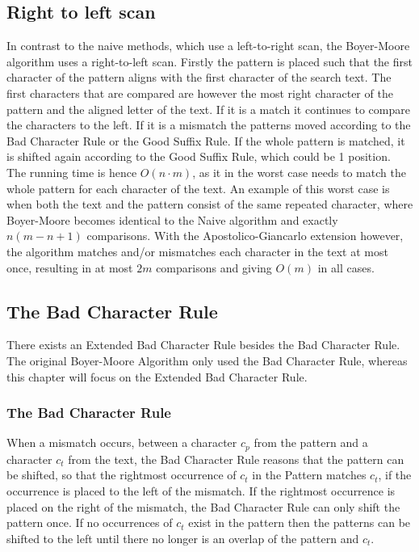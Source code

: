 \subsection{Right to left scan}
In contrast to the naive methods, which use a left-to-right scan, the Boyer-Moore algorithm uses a right-to-left scan. Firstly the pattern is placed such that the first character of the pattern aligns with the first character of the search text. The first characters that are compared are however the most right character of the pattern and the aligned letter of the text. If it is a match it continues to compare the characters to the left. If it is a mismatch the patterns moved according to the Bad Character Rule or the Good Suffix Rule. If the whole pattern is matched, it is shifted again according to the Good Suffix Rule, which could be 1 position. The running time is hence $O(n\cdot m)$, as it in the worst case needs to match the whole pattern for each character of the text. An example of this worst case is when both the text and the pattern consist of the same repeated character, where Boyer-Moore becomes identical to the Naive algorithm and exactly $n(m-n+1)$ comparisons. With the Apostolico-Giancarlo extension however, the algorithm matches and/or mismatches each character in the text at most once, resulting in at most $2m$ comparisons and giving $O(m)$ in all cases. 

\subsection{The Bad Character Rule}
There exists an Extended Bad Character Rule besides the Bad Character Rule. The original Boyer-Moore Algorithm only used the Bad Character Rule, whereas this chapter will focus on the Extended Bad Character Rule.

\subsubsection{The Bad Character Rule}
When a mismatch occurs, between a character $c_p$ from the pattern and a character $c_t$ from the text, the Bad Character Rule reasons that the pattern can be shifted, so that the rightmost occurrence of $c_t$ in the Pattern matches $c_t$, if the occurrence is placed to the left of the mismatch. If the rightmost occurrence is placed on the right of the mismatch, the Bad Character Rule can only shift the pattern once. If no occurrences of $c_t$ exist in the pattern then the patterns can be shifted to the left until there no longer is an overlap of the pattern and $c_t$.

